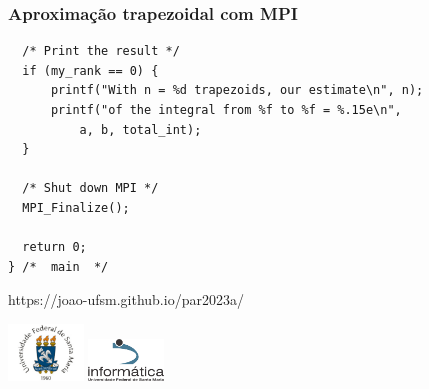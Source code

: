 \documentclass[xcolor={usenames,dvipsnames},12pt,presentation,aspectratio=169]{beamer}
\begin{document}
\begin{frame}[fragile]
  \frametitle{Aproximação trapezoidal com MPI}
\begin{center}
\begin{minipage}{0.95\textwidth}
  \begin{verbatim}
  /* Print the result */
  if (my_rank == 0) {
      printf("With n = %d trapezoids, our estimate\n", n);
      printf("of the integral from %f to %f = %.15e\n",
          a, b, total_int);
  }

  /* Shut down MPI */
  MPI_Finalize();

  return 0;
} /*  main  */
  \end{verbatim}
\end{minipage}
\end{center}
\end{frame}

\begin{frame}[plain]{}
  \begin{center}
    \vspace{2cm}
    \Large{https://joao-ufsm.github.io/par2023a/}
    
    \vspace{1cm}
    \includegraphics[width=2cm]{logo_ufsm}
    \hspace{0.5cm}
    \includegraphics[width=2cm]{logo_inf}
  \end{center}
\end{frame}
\end{document}
